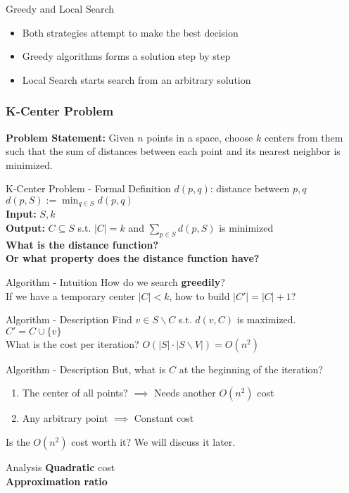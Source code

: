 \documentclass{beamer}
\newcommand*{\brk}{\\[10pt]}
\begin{document}
\begin{frame}{Greedy and Local Search}
    \begin{itemize}
        \item<1-> Both strategies attempt to make the best decision
        \item<2-> Greedy algorithms forms a solution step by step 
        \item<3-> Local Search starts search from an arbitrary solution
    \end{itemize}
\end{frame}

\begin{frame}
    \frametitle{K-Center Problem}
    \textbf{Problem Statement:} Given $n$ points in a space, 
    choose $k$ centers from them such that the sum of distances between 
    each point and its nearest neighbor is minimized. 
\end{frame}

\begin{frame}{K-Center Problem - Formal Definition}
    $d(p, q)$: distance between $p, q$ \\ 
    $d(p, S) := \min_{q \in S} d(p, q)$ \\
    \textbf{Input:} $S, k$ \\
    \textbf{Output:} $C \subseteq S$ s.t. $|C| = k$ and  $\sum_{p \in S} d(p, S)$ 
    is minimized \\[20pt]
    \pause 
    \textbf{What is the distance function? \\ Or what property does the distance function have?}
\end{frame}

\begin{frame}{Algorithm - Intuition}
    How do we search \textbf{greedily}? \\[10pt]
    If we have a temporary center $|C| < k$, how to build $|C'| = |C| + 1$?
\end{frame}

\begin{frame}{Algorithm - Description}
    Find $v \in S \backslash C$ s.t. $d(v, C)$ is maximized. \brk
    $C' = C \cup \{v\}$ \brk
    \pause
    What is the cost per iteration? \pause $O(|S| \cdot |S \backslash V|) = O(n^2)$
\end{frame}

\begin{frame}{Algorithm - Description}
    But, what is $C$ at the beginning of the iteration? 
    \pause 
    \begin{enumerate}
        \item The center of all points? $\implies$ Needs another $O(n^2)$ cost 
        \item Any arbitrary point $\implies$ Constant cost
    \end{enumerate}
    \pause
    Is the $O(n^2)$ cost worth it? We will discuss it later.
\end{frame}

\begin{frame}{Analysis}
    \textbf{Quadratic} cost
    \pause\brk
    \textbf{Approximation ratio}
\end{frame}
\end{document}
